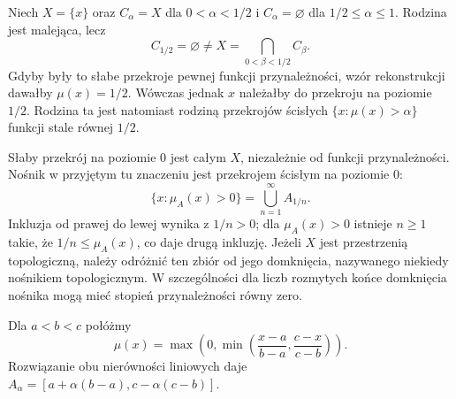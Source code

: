 \begin{przyklad}
\label{ex:ncl-cut-discontinuity}
Niech $X=\{x\}$ oraz $C_\alpha=X$ dla $0<\alpha<1/2$
i $C_\alpha=\varnothing$ dla $1/2\leq\alpha\leq1$.
Rodzina jest malejąca, lecz
\[
 C_{1/2}=\varnothing\ne X=\bigcap_{0<\beta<1/2}C_\beta.
\]
Gdyby były to słabe przekroje pewnej funkcji przynależności,
wzór rekonstrukcji dawałby $\mu(x)=1/2$. Wówczas jednak
$x$ należałby do przekroju na poziomie $1/2$. Rodzina ta
jest natomiast rodziną przekrojów ścisłych
$\{x:\mu(x)>\alpha\}$ funkcji stale równej $1/2$.
\end{przyklad}

\begin{uwaga}\label{rem:ncl-zero-cut}
Słaby przekrój na poziomie $0$ jest całym $X$, niezależnie
od funkcji przynależności. Nośnik w przyjętym tu znaczeniu
jest przekrojem ścisłym na poziomie $0$:
\[
 \{x:\mu_A(x)>0\}=\bigcup_{n=1}^\infty A_{1/n}.
\]
Inkluzja od prawej do lewej wynika z $1/n>0$; dla
$\mu_A(x)>0$ istnieje $n\geq1$ takie, że $1/n\leq\mu_A(x)$,
co daje drugą inkluzję. Jeżeli $X$ jest przestrzenią
topologiczną, należy odróżnić ten zbiór od jego domknięcia,
nazywanego niekiedy nośnikiem topologicznym. W szczególności
dla liczb rozmytych końce domknięcia nośnika mogą mieć
stopień przynależności równy zero.
\end{uwaga}

\begin{przyklad}
\label{ex:ncl-triangular-membership}
Dla $a<b<c$ połóżmy
\[
\mu(x)=\max\left(0,\min\left(\frac{x-a}{b-a},\frac{c-x}{c-b}\right)\right).
\]
Rozwiązanie obu nierówności liniowych daje
$A_\alpha=[a+\alpha(b-a),c-\alpha(c-b)]$.
\begin{center}
\end{center}
\end{przyklad}
